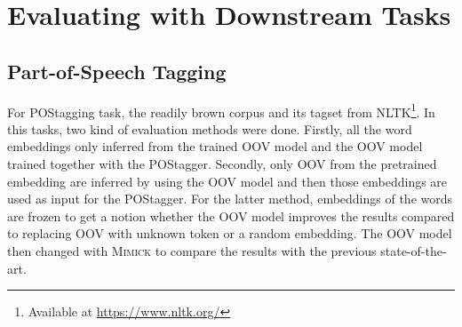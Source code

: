 
    
\section{Evaluating with Downstream Tasks}
    \subsection{Part-of-Speech Tagging}
        For POStagging task, the readily brown corpus and its tagset
        from NLTK\footnote{Available at \url{https://www.nltk.org/}}.
        In this tasks, two kind of evaluation methods were done.
        Firstly, all the word embeddings only inferred from the
        trained OOV model and the OOV model trained together with the
        POStagger. Secondly, only OOV from the pretrained embedding
        are inferred by using the OOV model and then those embeddings
        are used as input for the POStagger. For the latter method,
        embeddings of the words are frozen to get a notion whether the
        OOV model improves the results compared to replacing OOV with
        unknown token or a random embedding. The OOV model then
        changed with \textsc{Mimick} \citep{mimicking2017Pinter} to
        compare the results with the previous state-of-the-art.

